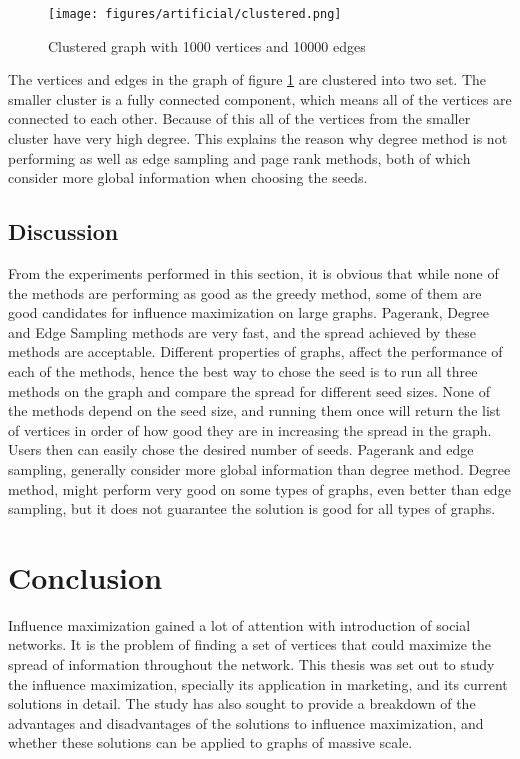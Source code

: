 \documentclass[english]{tktltiki}
\begin{document}
\begin{figure}[ht!]
\centering
\texttt{[image: figures/artificial/clustered.png]}
\caption{Clustered graph with 1000 vertices and 10000 edges}
\label{art:clustered}
\end{figure}

The vertices and edges in the graph of figure \ref{art:clustered} are clustered into two set. The smaller cluster is a fully connected component, which means all of the vertices are connected to each other. Because of this all of the vertices from the smaller cluster have very high degree. This explains the reason why degree method is not performing as well as edge sampling and page rank methods, both of which consider more global information when choosing the seeds.\\
\subsection{Discussion}
From the experiments performed in this section, it is obvious that while none of the methods are performing as good as the greedy method, some of them are good candidates for influence maximization on large graphs. Pagerank, Degree and Edge Sampling methods are very fast, and the spread achieved by these methods are acceptable. Different properties of graphs, affect the performance of each of the methods, hence the best way to chose the seed is to run all three methods on the graph and compare the spread for different seed sizes. None of the methods depend on the seed size, and running them once will return the list of vertices in order of how good they are in increasing the spread in the graph. Users then can easily chose the desired number of seeds. Pagerank and edge sampling, generally consider more global information than degree method. Degree method, might perform very good on some types of graphs, even better than edge sampling, but it does not guarantee the solution is good for all types of graphs. \\


\newpage
\section{Conclusion}
\label{sec:conclusion}
Influence maximization gained a lot of attention with introduction of social networks. 
It is the problem of finding a set of vertices that could maximize the spread of information throughout the network.
This thesis was set out to study the influence maximization, specially its application in marketing, and its current solutions in detail.
The study has also sought to provide a breakdown of the advantages and disadvantages of the solutions to influence maximization, and whether these solutions can be applied to graphs of massive scale.
\end{document}
